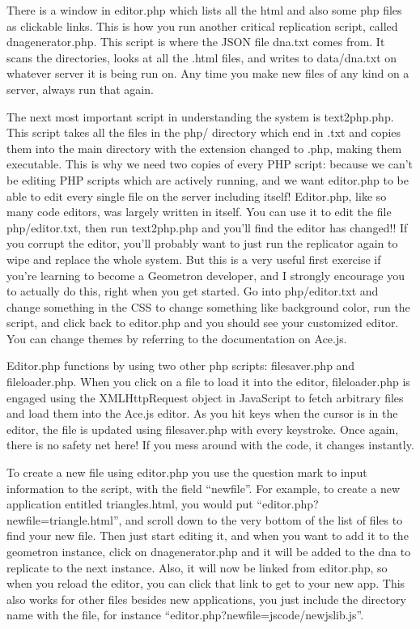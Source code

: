 There is a window in editor.php which lists all the html and also some php files as clickable links.  This is how you run another critical replication script, called dnagenerator.php.  This script is where the JSON file dna.txt comes from.  It scans the directories, looks at all the .html files, and writes to data/dna.txt on whatever server it is being run on.  Any time you make new files of any kind on a server, always run that again.  

The next most important script in understanding the system is text2php.php.  This script takes all the files in the php/ directory which end in .txt and copies them into the main directory with the extension changed to .php, making them executable.  This is why we need two copies of every PHP script: because we can't be editing PHP scripts which are actively running, and we want editor.php to be able to edit every single file on the server including itself! Editor.php, like so many code editors, was largely written in itself.  You can use it to edit the file php/editor.txt, then run text2php.php and you'll find the editor has changed!! If you corrupt the editor, you'll probably want to just run the replicator again to wipe and replace the whole system.  But this is a very useful first exercise if you're learning to become a Geometron developer, and I strongly encourage you to actually do this, right when you get started.  Go into php/editor.txt and change something in the CSS to change something like background color, run the script, and click back to editor.php and you should see your customized editor. You can change themes by referring to the documentation on Ace.js.

Editor.php functions by using two other php scripts: filesaver.php and fileloader.php.  When you click on a file to load it into the editor, fileloader.php is engaged using the XMLHttpRequest object in JavaScript to fetch arbitrary files and load them into the Ace.js editor.  As you hit keys when the cursor is in the editor, the file is updated using filesaver.php with every keystroke.  Once again, there is no safety net here! If you mess around with the code, it changes instantly.

To create a new file using editor.php you use the question mark to input information to the script, with the field ``newfile''. For example, to create a new application entitled triangles.html, you would put ``editor.php?newfile=triangle.html'', and scroll down to the very bottom of the list of files to find your new file.  Then just start editing it, and when you want to add it to the geometron instance, click on dnagenerator.php and it will be added to the dna to replicate to the next instance. Also, it will now be linked from editor.php, so when you reload the editor, you can click that link to get to your new app.   This also works for other files besides new applications, you just include the directory name with the file, for instance ``editor.php?newfile=jscode/newjslib.js''.  



